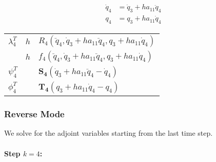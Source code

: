 \documentclass[10pt,letter]{book}
\begin{document}
     \begin{equation}\nonumber
       \begin{split}
         \dot{q}_{4} &= \dot{q}_3 + h a_{11} \ddot{q}_{4}  \\
         q_{4}       &= q_3 + h a_{11} \dot{q}_{4}
       \end{split}
     \end{equation}

     \begin{table}[H]
       \centering
       \begin{tabular}{l | l  |l}
         $\lambda_{4}^T$ & $h$ & $R_4(\ddot{q}_4, \dot{q}_3 + h a_{11} \ddot{q}_{4},
         q_3 + h a_{11} \dot{q}_{4} )$ \\
         & $h$ & $f_4(\ddot{q}_4, \dot{q}_3 + h a_{11} \ddot{q}_{4},  q_3 + h a_{11} \dot{q}_{4} )$\\
         $\psi_4^T$ & & $\mathbf{S_4}\left(\dot{q}_3 + h a_{11} \ddot{q}_{4}- \dot{q}_{4} \right)$ \\
         $\phi_4^T$ & & $\mathbf{T_4}\left(q_3 + h a_{11} \dot{q}_{4} - q_{4}\right) $ \\
       \end{tabular}
     \end{table}

     \subsubsection{Reverse Mode}

     We solve for the adjoint variables starting from the last time
     step.

     \paragraph{Step $k=4$:}
\end{document}
